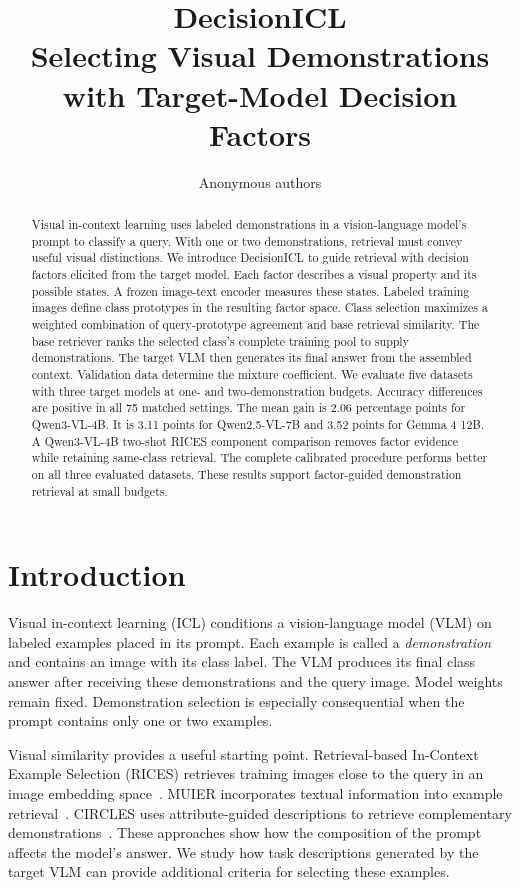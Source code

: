 \documentclass[10pt,twocolumn,letterpaper]{article}
\title{DecisionICL\\Selecting Visual Demonstrations with Target-Model Decision Factors}
\author{Anonymous authors}
\newcommand{\method}{DecisionICL\xspace}
\begin{document}
\maketitle

\begin{abstract}
Visual in-context learning uses labeled demonstrations in a vision-language model's prompt to classify a query. With one or two demonstrations, retrieval must convey useful visual distinctions. We introduce \method to guide retrieval with decision factors elicited from the target model. Each factor describes a visual property and its possible states. A frozen image-text encoder measures these states. Labeled training images define class prototypes in the resulting factor space. Class selection maximizes a weighted combination of query-prototype agreement and base retrieval similarity. The base retriever ranks the selected class's complete training pool to supply demonstrations. The target VLM then generates its final answer from the assembled context. Validation data determine the mixture coefficient. We evaluate five datasets with three target models at one- and two-demonstration budgets. Accuracy differences are positive in all 75 matched settings. The mean gain is 2.06 percentage points for Qwen3-VL-4B. It is 3.11 points for Qwen2.5-VL-7B and 3.52 points for Gemma 4 12B. A Qwen3-VL-4B two-shot RICES component comparison removes factor evidence while retaining same-class retrieval. The complete calibrated procedure performs better on all three evaluated datasets. These results support factor-guided demonstration retrieval at small budgets.
\end{abstract}

\section{Introduction}
\label{sec:intro}
Visual in-context learning (ICL) conditions a vision-language model (VLM) on labeled examples placed in its prompt. Each example is called a \emph{demonstration} and contains an image with its class label. The VLM produces its final class answer after receiving these demonstrations and the query image. Model weights remain fixed. Demonstration selection is especially consequential when the prompt contains only one or two examples.

Visual similarity provides a useful starting point. Retrieval-based In-Context Example Selection (RICES) retrieves training images close to the query in an image embedding space~\cite{rices,flamingo}. MUIER incorporates textual information into example retrieval~\cite{muier}. CIRCLES uses attribute-guided descriptions to retrieve complementary demonstrations~\cite{circles}. These approaches show how the composition of the prompt affects the model's answer. We study how task descriptions generated by the target VLM can provide additional criteria for selecting these examples.
\end{document}
